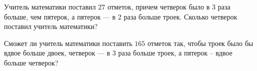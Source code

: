 \begin{listofex}
	\item Учитель математики поставил \( 27 \) отметок, причем четверок было в \( 3 \) раза больше, чем
	пятерок, а пятерок --- в \( 2 \) раза больше троек. Сколько четверок поставил учитель математики?
	\item Сможет ли учитель математики поставить \( 165 \) отметок так, чтобы троек было бы вдвое
	больше двоек, четверок --- в \( 3 \) раза больше троек, а пятерок – вдвое больше четверок?
\end{listofex}